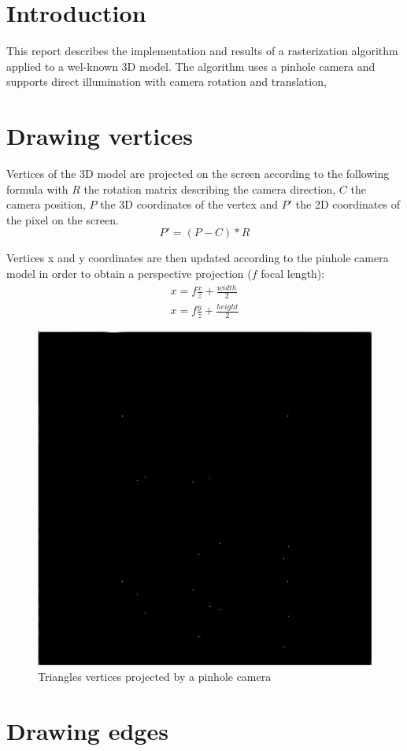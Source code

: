 \section*{Introduction}
This report describes the implementation and results of a rasterization algorithm applied to a wel-known 3D model. The algorithm uses a pinhole camera and supports direct illumination with camera rotation and translation, 

\setcounter{section}{1} 

\section{Drawing vertices}

Vertices of the 3D model are projected on the screen according to the following formula with $R$ the rotation matrix describing the camera direction, $C$ the camera position, $P$ the 3D coordinates of the vertex and $P'$ the 2D coordinates of the pixel on the screen.
\begin{equation}
P' = (P - C) * R
\end{equation}

Vertices x and y coordinates are then updated according to the pinhole camera model in order to obtain a perspective projection ($f$ focal length):
\begin{equation}
\begin{split}
x = f \frac{x}{z} + \frac{width}{2}\\
x = f \frac{y}{z} + \frac{height}{2}
\end{split}
\end{equation}

\begin{figure}[H]
\centering
\includegraphics[width=0.4\linewidth]{img/points.jpg}
\caption{Triangles vertices projected by a pinhole camera}
\end{figure}


\section{Drawing edges}

